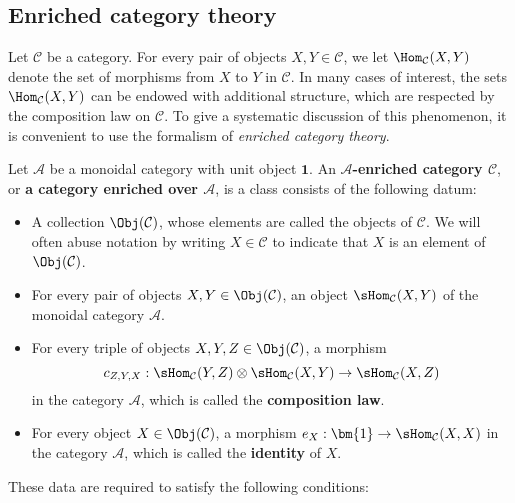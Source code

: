 \subsection{Enriched category theory}
Let $\mathcal{C}$ be a category. For every pair of objects $X,Y\in\mathcal{C}$, we let $\Hom_{\mathcal{C}}(X,Y)$ denote the set of morphisms from $X$ to $Y$ in $\mathcal{C}$. In many cases of interest, the sets $\Hom_{\mathcal{C}}(X,Y)$ can be endowed with additional structure, which are respected by the composition law on $\mathcal{C}$. To give a systematic discussion of this phenomenon, it is convenient to use the formalism of \textit{enriched category theory}.\par
Let $\mathcal{A}$ be a monoidal category with unit object $\bm{1}$. An \textbf{$\mathcal{A}$-enriched category $\mathcal{C}$}, or \textbf{a category enriched over $\mathcal{A}$}, is a class consists of the following datum:
\begin{itemize}
\item A collection $\Obj(\mathcal{C})$, whose elements are called the objects of $\mathcal{C}$. We will often abuse notation by writing $X\in\mathcal{C}$ to indicate that $X$ is an element of $\Obj(\mathcal{C})$.
\item For every pair of objects $X,Y\in\Obj(\mathcal{C})$, an object $\sHom_{\mathcal{C}}(X,Y)$ of the monoidal category $\mathcal{A}$.
\item For every triple of objects $X,Y,Z\in\Obj(\mathcal{C})$, a morphism
\[c_{Z,Y,X}:\sHom_{\mathcal{C}}(Y,Z)\otimes\sHom_{\mathcal{C}}(X,Y)\to\sHom_{\mathcal{C}}(X,Z)\]
in the category $\mathcal{A}$, which is called the \textbf{composition law}.
\item For every object $X\in\Obj(\mathcal{C})$, a morphism $e_X:\bm{1}\to\sHom_{\mathcal{C}}(X,X)$ in the category $\mathcal{A}$, which is called the \textbf{identity} of $X$.
\end{itemize}
These data are required to satisfy the following conditions:
